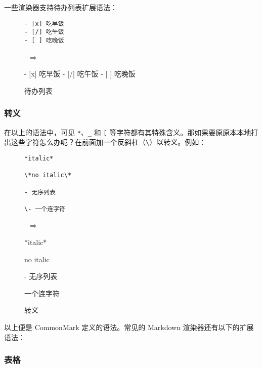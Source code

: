 \documentclass[a4paper,fontset=none]{ctexart}
\begin{document}
一些渲染器支持待办列表扩展语法：

\begin{figure}[H]
    \centering
    \begin{minipage}{0.45\textwidth}
        \begin{verbatim}
- [x] 吃早饭
- [/] 吃午饭
- [ ] 吃晚饭
        \end{verbatim}
    \end{minipage}
    \, $\Longrightarrow$ \,
    \begin{minipage}{0.45\textwidth}
\begin{markdown}
- [x] 吃早饭
- [/] 吃午饭
- [ ] 吃晚饭
\end{markdown}
    \end{minipage}
    \caption{待办列表}
\end{figure}

\subsubsection{转义}

在以上的语法中，可见 \verb|*|、\verb|_| 和 \verb|[| 等字符都有其特殊含义。那如果要原原本本地打出这些字符怎么办呢？在前面加一个反斜杠（\verb|\|）以转义。例如：

\begin{figure}[H]
    \centering
    \begin{minipage}{0.45\textwidth}
        \begin{verbatim}
*italic*

\*no italic\*

- 无序列表

\- 一个连字符
        \end{verbatim}
    \end{minipage}
    \, $\Longrightarrow$ \,
    \begin{minipage}{0.45\textwidth}
\begin{markdown}
*italic*

\*no italic\*

- 无序列表

\- 一个连字符
\end{markdown}
    \end{minipage}
    \caption{转义}
\end{figure}

以上便是 CommonMark 定义的语法。常见的 Markdown 渲染器还有以下的扩展语法：

\subsubsection{表格}
\end{document}
